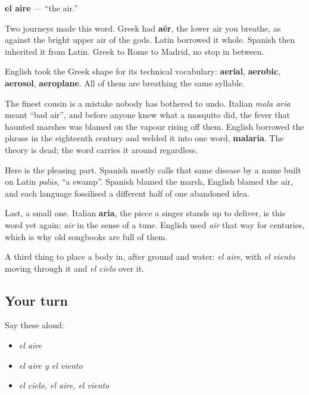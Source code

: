 \begin{cousinweb}
\textbf{el aire} — \textquotedblleft{}the air.\textquotedblright{}

Two journeys made this word. Greek had \textbf{aēr}, the lower air you breathe, as against the bright upper air of the gods. Latin borrowed it whole. Spanish then inherited it from Latin. Greek to Rome to Madrid, no stop in between.

English took the Greek shape for its technical vocabulary: \textbf{aerial}, \textbf{aerobic}, \textbf{aerosol}, \textbf{aeroplane}. All of them are breathing the same syllable.

The finest cousin is a mistake nobody has bothered to undo. Italian \emph{mala aria} meant \textquotedblleft{}bad air\textquotedblright{}, and before anyone knew what a mosquito did, the fever that haunted marshes was blamed on the vapour rising off them. English borrowed the phrase in the eighteenth century and welded it into one word, \textbf{malaria}. The theory is dead; the word carries it around regardless.

Here is the pleasing part. Spanish mostly calls that same disease by a name built on Latin \emph{palūs}, \textquotedblleft{}a swamp\textquotedblright{}. Spanish blamed the marsh, English blamed the air, and each language fossilised a different half of one abandoned idea.

Last, a small one. Italian \textbf{aria}, the piece a singer stands up to deliver, is this word yet again: \emph{air} in the sense of a tune. English used \emph{air} that way for centuries, which is why old songbooks are full of them.
\end{cousinweb}

\begin{grammarlens}[title={What you've built}]
A third thing to place a body in, after ground and water: \emph{el aire}, with \emph{el viento} moving through it and \emph{el cielo} over it.
\end{grammarlens}

\subsection*{Your turn}
Say these aloud:

\begin{itemize}
\raggedright
  \item \emph{el aire}
  \item \emph{el aire y el viento}
  \item \emph{el cielo, el aire, el viento}
\end{itemize}

